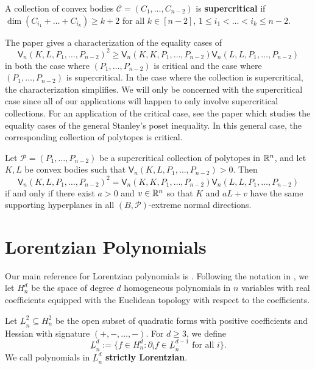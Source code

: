 \documentclass{puthesis-UG}
\begin{document}
\begin{defn}
	A collection of convex bodies $\mathcal{C} = (C_1, \ldots, C_{n-2})$ is \textbf{supercritical} if $\dim (C_{i_1} + \ldots + C_{i_k}) \geq k+2$ for all $k \in [n-2]$, $1 \leq i_1 < \ldots < i_k \leq n-2$. 
\end{defn} 

The paper \cite{shenfeld2022extremals} gives a characterization of the equality cases of 
\[
	\mathsf{V}_n(K, L, P_1, \ldots, P_{n-2})^2 \geq \mathsf{V}_n (K, K, P_1, \ldots, P_{n-2}) \mathsf{V}_n (L, L, P_1, \ldots, P_{n-2})
\]
in both the case where $(P_1, \ldots, P_{n-2})$ is critical and the case where $(P_1, \ldots, P_{n-2})$ is supercritical. In the case where the collection is supercritical, the characterization simplifies. We will only be concerned with the supercritical case since all of our applications will happen to only involve supercritical collections. For an application of the critical case, see the paper \cite{ma2022extremals} which studies the equality cases of the general Stanley's poset inequality. In this general case, the corresponding collection of polytopes is critical.
	
\begin{thm} \label{AF-equality-polytopes-theorem}
	Let $\mathcal{P} = (P_1, \ldots, P_{n-2})$ be a supercritical collection of polytopes in $\mathbb{R}^n$, and let $K, L$ be convex bodies such that $\mathsf{V}_n (K, L, P_1, \ldots, P_{n-2}) > 0$. Then 
	\[
		\mathsf{V}_n (K, L, P_1, \ldots, P_{n-2})^2 = \mathsf{V}_n (K, K, P_1, \ldots, P_{n-2}) \mathsf{V}_n (L, L, P_1, \ldots, P_{n-2})
	\]
	if and only if there exist $a > 0$ and $v \in \mathbb{R}^n$ so that $K$ and $a L + v$ have the same supporting hyperplanes in all $(B, \mathcal{P})$-extreme normal directions.
\end{thm}

\section{Lorentzian Polynomials}

Our main reference for Lorentzian polynomials is \cite{lorentzian-polynomials}. Following the notation in \cite{lorentzian-polynomials}, we let $H_n^d$ be the space of degree $d$ homogeneous polynomials in $n$ variables with real coefficients equipped with the Euclidean topology with respect to the coefficients.  
\begin{defn}
	Let $\underbar{L}_n^2 \subseteq H_n^2$ be the open subset of quadratic forms with positive coefficients and Hessian with signature $(+, -, \ldots, -)$. For $d \geq 3$, we define 
	\[
		\underbar{L}_n^d := \{f \in H_n^d : \partial_i f \in \underbar{L}_n^{d-1} \text{ for all $i$}\}.
	\] 
	We call polynomials in $\underbar{L}_n^d$ \textbf{strictly Lorentzian}.
\end{defn}
\end{document}
